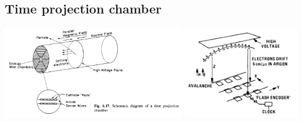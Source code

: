 \documentclass[11pt]{article}
\begin{document}
\subsection{Time projection chamber}
\begin{center}
  \includegraphics[width=0.6\textwidth,valign=t]{figs/tpc1.png}
  \includegraphics[width=0.38\textwidth,valign=t]{figs/tpc2.png}
\end{center}
\end{document}
